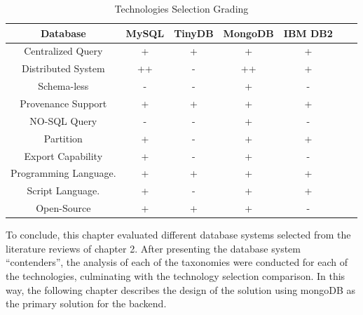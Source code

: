 \begin{table}
    \label{tab:technology-selection}
    \begin{center}
        \begin{tabular}[!h]{|c|c|c|c|c|c|c|}\hline 
        \textbf{Database} & \textbf{MySQL} & \textbf{TinyDB} & \textbf{MongoDB} & \textbf{IBM DB2}\\\hline
        Centralized Query & + & + & + & + \\\hline 
        Distributed System & ++ & - & ++ & +\\\hline 
        Schema-less & - & - & + & -\\\hline 
        Provenance Support & + & + & + & +\\\hline 
        NO-SQL Query & - & - & + & -\\\hline 
        Partition & + & - & + & +\\\hline 
        Export Capability & + & - & + & -\\\hline 
        Programming Language. & + & + & + & +\\\hline
        Script Language. & + & - & + & +\\\hline
        Open-Source & + & + & + & -\\\hline
        \end{tabular}
        \caption{Technologies Selection Grading}
    \end{center}
\end{table}

To conclude, this chapter evaluated different database systems selected from
the literature reviews of chapter 2. After presenting the database system
``contenders'', the analysis of each of the taxonomies were conducted for each
of the technologies, culminating with the technology selection comparison. In
this way, the following chapter describes the design of the solution using
mongoDB as the primary solution for the backend.

